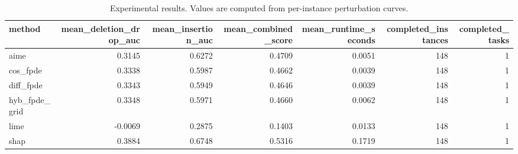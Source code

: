 \begin{table}[t]
\caption{Experimental results. Values are computed from per-instance perturbation curves.}
\label{tab:main_results_computed}
\centering
\begin{tabular}{lrrrrrr}
\toprule
method & mean\_deletion\_drop\_auc & mean\_insertion\_auc & mean\_combined\_score & mean\_runtime\_seconds & completed\_instances & completed\_tasks \\
\midrule
aime & 0.3145 & 0.6272 & 0.4709 & 0.0051 & 148 & 1 \\
cos\_fpde & 0.3338 & 0.5987 & 0.4662 & 0.0039 & 148 & 1 \\
diff\_fpde & 0.3343 & 0.5949 & 0.4646 & 0.0039 & 148 & 1 \\
hyb\_fpde\_grid & 0.3348 & 0.5971 & 0.4660 & 0.0062 & 148 & 1 \\
lime & -0.0069 & 0.2875 & 0.1403 & 0.0133 & 148 & 1 \\
shap & 0.3884 & 0.6748 & 0.5316 & 0.1719 & 148 & 1 \\
\bottomrule
\end{tabular}

\end{table}

